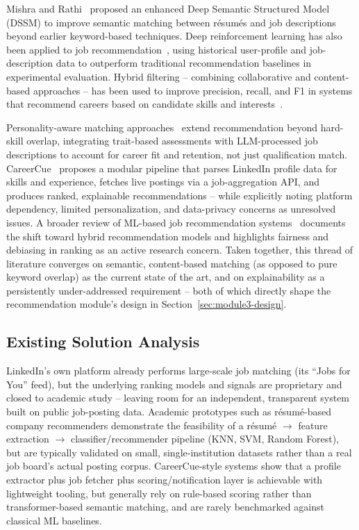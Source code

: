 \documentclass[11pt,a4paper]{article}
\begin{document}
Mishra and Rathi~\cite{mishra2022} proposed an enhanced Deep Semantic Structured Model
(DSSM) to improve semantic matching between r\'esum\'es and job descriptions beyond
earlier keyword-based techniques. Deep reinforcement learning has also been applied to
job recommendation~\cite{drl}, using historical user-profile and job-description data to
outperform traditional recommendation baselines in experimental evaluation. Hybrid
filtering -- combining collaborative and content-based approaches -- has been used to
improve precision, recall, and F1 in systems that recommend careers based on candidate
skills and interests~\cite{hybrid}.

Personality-aware matching approaches~\cite{jobfit} extend recommendation beyond
hard-skill overlap, integrating trait-based assessments with LLM-processed job
descriptions to account for career fit and retention, not just qualification match.
CareerCue~\cite{careercue} proposes a modular pipeline that parses LinkedIn profile data
for skills and experience, fetches live postings via a job-aggregation API, and produces
ranked, explainable recommendations -- while explicitly noting platform dependency,
limited personalization, and data-privacy concerns as unresolved issues. A broader review
of ML-based job recommendation systems~\cite{review2025} documents the shift toward
hybrid recommendation models and highlights fairness and debiasing in ranking as an
active research concern. Taken together, this thread of literature converges on
semantic, content-based matching (as opposed to pure keyword overlap) as the current
state of the art, and on explainability as a persistently under-addressed requirement --
both of which directly shape the recommendation module's design in
Section~\ref{sec:module3-design}.

\subsection{Existing Solution Analysis}
\label{sec:lit-existing}

LinkedIn's own platform already performs large-scale job matching (its ``Jobs for You''
feed), but the underlying ranking models and signals are proprietary and closed to
academic study -- leaving room for an independent, transparent system built on public
job-posting data. Academic prototypes such as r\'esum\'e-based company recommenders
demonstrate the feasibility of a r\'esum\'e $\rightarrow$ feature extraction
$\rightarrow$ classifier/recommender pipeline (KNN, SVM, Random Forest), but are
typically validated on small, single-institution datasets rather than a real job board's
actual posting corpus. CareerCue-style systems show that a profile extractor plus job
fetcher plus scoring/notification layer is achievable with lightweight tooling, but
generally rely on rule-based scoring rather than transformer-based semantic matching, and
are rarely benchmarked against classical ML baselines.
\end{document}
